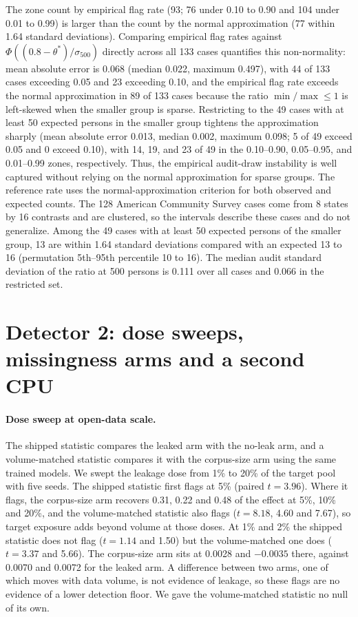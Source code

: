 \documentclass[10pt]{article}
\theoremstyle{definition}
\begin{document}
The zone count by empirical flag rate (93; 76 under 0.10 to 0.90 and 104 under 0.01 to 0.99) is larger than the count by the normal approximation (77 within 1.64 standard deviations). Comparing empirical flag rates against $\Phi((0.8-\theta^\ast)/\sigma_{500})$ directly across all 133 cases quantifies this non-normality: mean absolute error is 0.068 (median 0.022, maximum 0.497), with 44 of 133 cases exceeding 0.05 and 23 exceeding 0.10, and the empirical flag rate exceeds the normal approximation in 89 of 133 cases because the ratio $\min/\max\le 1$ is left-skewed when the smaller group is sparse. Restricting to the 49 cases with at least 50 expected persons in the smaller group tightens the approximation sharply (mean absolute error 0.013, median 0.002, maximum 0.098; 5 of 49 exceed 0.05 and 0 exceed 0.10), with 14, 19, and 23 of 49 in the 0.10--0.90, 0.05--0.95, and 0.01--0.99 zones, respectively. Thus, the empirical audit-draw instability is well captured without relying on the normal approximation for sparse groups. The reference rate uses the normal-approximation criterion for both observed and expected counts. The 128 American Community Survey cases come from 8 states by 16 contrasts and are clustered, so the intervals describe these cases and do not generalize. Among the 49 cases with at least 50 expected persons of the smaller group, 13 are within 1.64 standard deviations compared with an expected 13 to 16 (permutation 5th--95th percentile 10 to 16). The median audit standard deviation of the ratio at 500 persons is 0.111 over all cases and 0.066 in the restricted set.

\section{Detector 2: dose sweeps, missingness arms and a second CPU}
\label{apd:fullscale}

\paragraph{Dose sweep at open-data scale.} The shipped statistic compares the leaked arm with the no-leak arm, and a volume-matched statistic compares it with the corpus-size arm using the same trained models. We swept the leakage dose from 1\% to 20\% of the target pool with five seeds. The shipped statistic first flags at 5\% (paired $t=3.96$). Where it flags, the corpus-size arm recovers 0.31, 0.22 and 0.48 of the effect at 5\%, 10\% and 20\%, and the volume-matched statistic also flags ($t=8.18$, 4.60 and 7.67), so target exposure adds beyond volume at those doses. At 1\% and 2\% the shipped statistic does not flag ($t=1.14$ and 1.50) but the volume-matched one does ($t=3.37$ and 5.66). The corpus-size arm sits at 0.0028 and $-0.0035$ there, against 0.0070 and 0.0072 for the leaked arm. A difference between two arms, one of which moves with data volume, is not evidence of leakage, so these flags are no evidence of a lower detection floor. We gave the volume-matched statistic no null of its own.
\end{document}
